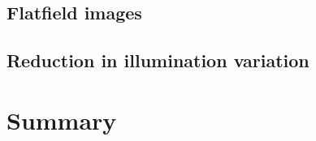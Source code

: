 \documentclass[letterpaper,11pt]{article}
\begin{document}
\subsection{Flatfield images}
\label{ssec:flatfield_images}

\subsection{Reduction in illumination variation}
\label{ssec:reduction_in_illumination_variation}

\section{Summary}
\label{sec:summary}


\end{document}
